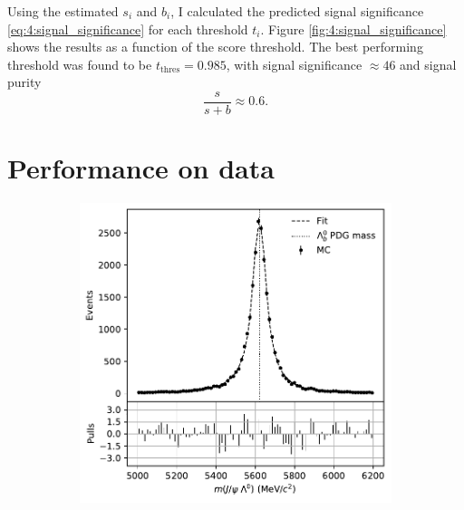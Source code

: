 Using the estimated $s_i$ and $b_i$, I calculated the predicted signal significance \eqref{eq:4:signal_significance} for each threshold $t_i$.
Figure \ref{fig:4:signal_significance} shows the results as a function of the score threshold.
The best performing threshold was found to be $t_\text{thres} = 0.985$, with signal significance $\approx 46$ and signal purity
\begin{equation}
	\frac{s}{s+b} \approx 0.6.
\end{equation}

\section{Performance on data}
\label{sec:4:performance_data}

\begin{figure}[t]
	\centering
	\begin{subfigure}{.45\textwidth}
		\includegraphics[width=\textwidth]{graphics/04-event_selection/MC_lambdab_hard_fit.pdf}
		\caption{}
		\label{fig:4:mc_fit}
	\end{subfigure}
	\begin{subfigure}{.45\textwidth}

\end{subfigure}
\end{figure}

